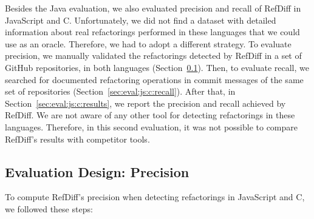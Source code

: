 \documentclass[10pt,journal,compsoc]{IEEEtran}
\begin{document}
Besides the Java evaluation, we also evaluated precision and recall of RefDiff in JavaScript and C. Unfortunately, we did not find a dataset with detailed information about real refactorings performed in these languages that we could use as an oracle.
Therefore, we had to adopt a different strategy. 
To evaluate precision, we manually validated the refactorings detected by RefDiff in a set of GitHub repositories, in both languages (Section~\ref{sec:eval:js:c:precision}). Then, to evaluate recall, we searched for documented refactoring operations in commit messages of the same set of repositories (Section~\ref{sec:eval:js:c:recall}).
After that, in Section~\ref{sec:eval:js:c:results}, we report the precision and recall achieved by RefDiff.  We are not aware of any other tool for detecting refactorings in these languages. Therefore, in this second evaluation, it was not possible to compare RefDiff's results with competitor tools.



\subsection{Evaluation Design: Precision}
\label{sec:eval:js:c:precision}


To compute RefDiff's precision when detecting refactorings in JavaScript and C, we followed these steps:
\end{document}
